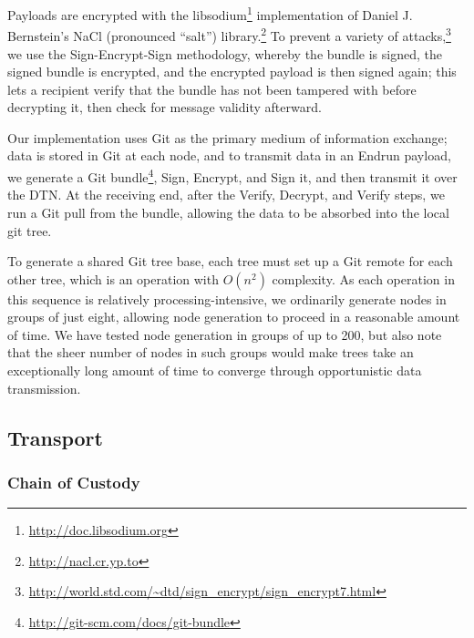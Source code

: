 \documentclass[12pt]{article}
\begin{document}
    Payloads are encrypted with the libsodium\footnote{\url{http://doc.libsodium.org}} implementation of Daniel J. Bernstein's NaCl (pronounced ``salt'') library.\footnote{\url{http://nacl.cr.yp.to}} To prevent a variety of attacks,\footnote{\url{http://world.std.com/~dtd/sign_encrypt/sign_encrypt7.html}} we use the Sign-Encrypt-Sign methodology, whereby the bundle is signed, the signed bundle is encrypted, and the encrypted payload is then signed again; this lets a recipient verify that the bundle has not been tampered with before decrypting it, then check for message validity afterward.
    
    Our implementation uses Git as the primary medium of information exchange; data is stored in Git at each node, and to transmit data in an Endrun payload, we generate a Git bundle\footnote{\url{http://git-scm.com/docs/git-bundle}}, Sign, Encrypt, and Sign it, and then transmit it over the DTN. At the receiving end, after the Verify, Decrypt, and Verify steps, we run a Git pull from the bundle, allowing the data to be absorbed into the local git tree.
    
    To generate a shared Git tree base, each tree must set up a Git remote for each other tree, which is an operation with $O(n^2)$ complexity. As each operation in this sequence is relatively processing-intensive, we ordinarily generate nodes in groups of just eight, allowing node generation to proceed in a reasonable amount of time. We have tested node generation in groups of up to 200, but also note that the sheer number of nodes in such groups would make trees take an exceptionally long amount of time to converge through opportunistic data transmission.
    
  \subsection{Transport}
  \label{subsec:transport}
  
  \subsubsection{Chain of Custody}
  \label{subsec:chainofcustody}
  
\end{document}
